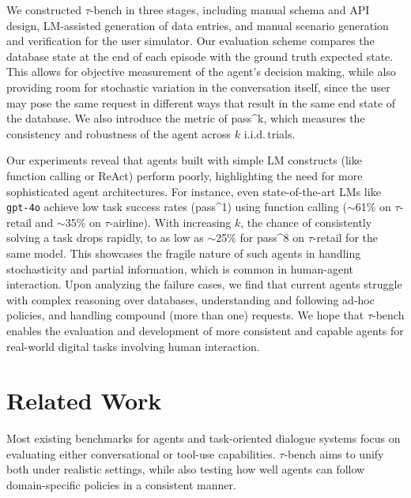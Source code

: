 \documentclass{article}
\newcommand{\benchmark}{$\tau$-bench}
\newcommand{\retail}{$\tau$-retail}  %
\newcommand{\airline}{$\tau$-airline}
\begin{document}
We constructed \benchmark{} in three stages, including manual schema and API design, LM-assisted generation of data entries, and manual scenario generation and verification for the user simulator.
Our evaluation scheme compares the database state at the end of each episode with the ground truth expected state. This allows for objective measurement of the agent's decision making, while also providing room for stochastic variation in the conversation itself, since the user may pose the same request in different ways that result in the same end state of the database. We also introduce the metric of pass\textasciicircum k, which measures the consistency and robustness of the agent across $k$ i.i.d.\,trials. 

Our experiments reveal that agents built with simple LM constructs (like function calling or ReAct) perform poorly, highlighting the need for more sophisticated agent architectures. For instance, even state-of-the-art LMs like \texttt{gpt-4o} achieve low task success rates (pass\textasciicircum 1) using function calling ($\sim$61\% on \retail{} and $\sim$35\% on \airline). With increasing $k$, the chance of consistently solving a task drops rapidly, to as low as $\sim$25\% for pass\textasciicircum 8 on \retail{} for the same model. This showcases the fragile nature of such agents in handling stochasticity and partial information, which is common in human-agent interaction. Upon analyzing the failure cases, we find that current agents struggle with complex reasoning over databases, understanding and following ad-hoc policies, and handling compound (more than one) requests. We hope that \benchmark{} enables the evaluation and development of more consistent and capable agents for real-world digital tasks involving human interaction.









\section{Related Work}

Most existing benchmarks for agents and task-oriented dialogue systems focus on evaluating either conversational or tool-use capabilities. \benchmark{} aims to unify both under realistic settings, while also testing how well agents can follow domain-specific policies in a consistent manner. 
\end{document}
